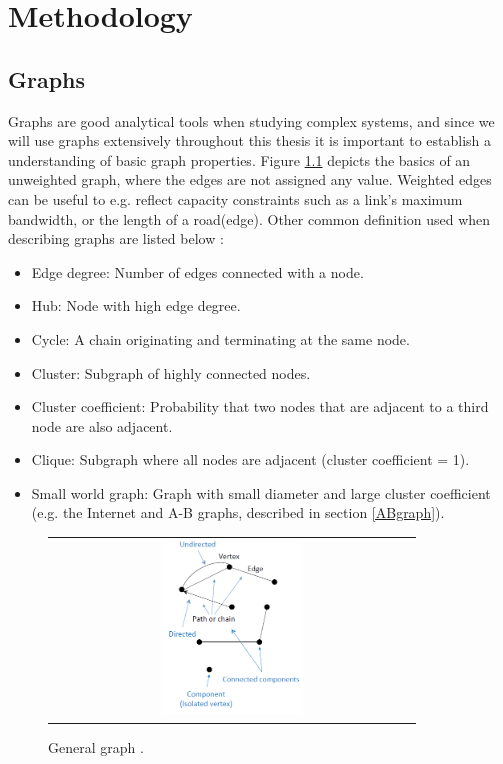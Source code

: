 \chapter{Methodology}

\section{Graphs}
Graphs are good analytical tools when studying complex systems, and since we will use graphs extensively throughout this thesis it is important to establish a understanding of basic graph properties. Figure \ref{fig:generalGraph} depicts the basics of an unweighted graph, where the edges are not assigned any value. Weighted edges can be useful to e.g. reflect capacity constraints such as a link's maximum bandwidth, or the length of a road(edge). Other common definition used when describing graphs are listed below \cite{audestad}:
\begin{itemize}
\item Edge degree: Number of edges connected with a node.
\item Hub: Node with high edge degree.
\item Cycle: A chain originating and terminating at the same node.
\item Cluster: Subgraph of highly connected nodes.
\item Cluster coefficient: Probability that two nodes that are adjacent to a third node are also adjacent.
\item Clique: Subgraph where all nodes are adjacent (cluster coefficient = 1).
\item Small world graph: Graph with small diameter and large cluster coefficient (e.g. the Internet and A-B graphs, described in section \ref{ABgraph}).
\end{itemize}

\begin{figure}[h]
\centering
\begin{tabular}{@{}c@{}}
\includegraphics[width=0.4\textwidth]{../Figures/generalGraph.png}
\end{tabular}
\caption{\label{fig:generalGraph} General graph \cite{audestad}.}
\end{figure}

